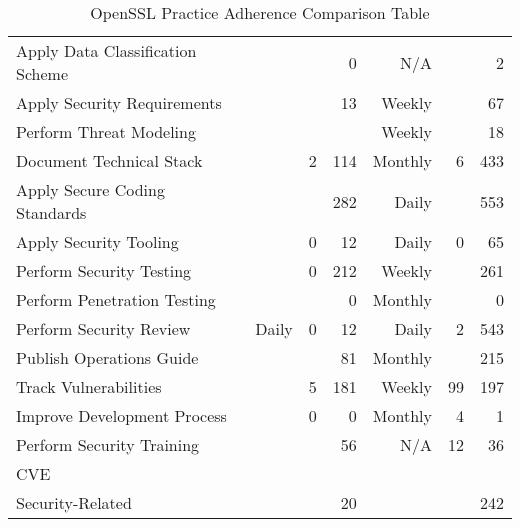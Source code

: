 \begin{table*}
	\begin{center}	
		\caption{OpenSSL Practice Adherence Comparison Table}
		\begin{tiny}
			
			\begin{tabular}{|l|rrr||rrr|}
				Apply Data Classification Scheme & &  & 0 & N/A & & 2\\
				Apply Security Requirements  & &  & 13 & Weekly & & 67\\
				Perform Threat Modeling &  &  &  & Weekly & & 18\\
				Document Technical Stack  &  & 2 & 114 & Monthly & 6 & 433\\
				Apply Secure Coding Standards  &  &  & 282 & Daily & & 553\\
				Apply Security Tooling  &  & 0 & 12 & Daily & 0 & 65\\
				Perform Security Testing &  & 0  & 212 & Weekly & & 261\\
				Perform Penetration Testing  &  & & 0 & Monthly & & 0\\
				Perform Security Review  & Daily & 0 & 12 & Daily & 2 & 543\\
				Publish Operations Guide &  &  & 81 & Monthly & & 215\\
				Track Vulnerabilities & & 5 & 181 & Weekly & 99 & 197\\
				Improve Development Process & & 0 & 0 & Monthly & 4 & 1\\
				Perform Security Training &  &  & 56 & N/A & 12 & 36\\
				CVE &  &  &  & &  & \\
				Security-Related &  &  & 20 & & & 242 \\
				
			\end{tabular}
			
			\label{tab:pma_paComparisonTable}
		\end{tiny}
	\end{center}
\end{table*}




